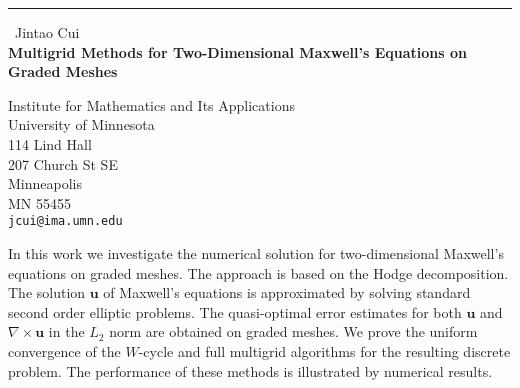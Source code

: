 \documentclass{report}
\begin{document}
\begin{center}
\rule{6in}{1pt} \
{\large Jintao Cui \\
{\bf  Multigrid Methods for Two-Dimensional Maxwell's Equations on Graded Meshes}}

Institute for Mathematics and Its Applications \\ University of Minnesota \\ 114 Lind Hall \\ 207 Church St SE \\ Minneapolis \\ MN 55455
\\
{\tt jcui@ima.umn.edu}\end{center}

In this work we investigate the numerical solution for two-dimensional
Maxwell's equations on graded meshes. The approach is based on the Hodge
decomposition. The solution $\boldsymbol{u}$ of Maxwell's equations is
approximated by solving standard second order elliptic problems. The
quasi-optimal error estimates for both $\boldsymbol{u}$ and $\nabla
\times \boldsymbol{u}$ in the $L_2$ norm are obtained on graded meshes.
We prove the uniform convergence of the $W$-cycle and full multigrid
algorithms for the resulting discrete problem. The performance of these
methods is illustrated by numerical results.
\end{document}
